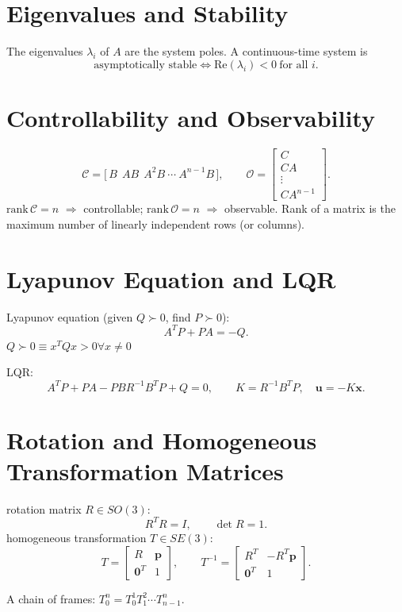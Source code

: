 \documentclass[10pt]{article}
\begin{document}
\section{Eigenvalues and Stability}
The eigenvalues $\lambda_i$ of $A$ are the system poles. A continuous-time system is
\[
\text{asymptotically stable} \iff \mathrm{Re}(\lambda_i)<0\ \text{for all } i.
\]

\section{Controllability and Observability}
\[
\mathcal{C}=\big[\,B\ \ AB\ \ A^2B\ \cdots\ A^{n-1}B\,\big],\qquad
\mathcal{O}=\begin{bmatrix} C\\ CA\\ \vdots\\ CA^{n-1}\end{bmatrix}.
\]
$\mathrm{rank}\,\mathcal{C}=n$ $\Rightarrow$ controllable; $\mathrm{rank}\,\mathcal{O}=n$ $\Rightarrow$ observable.
Rank of a matrix is the maximum number of linearly independent rows (or columns).

\section{Lyapunov Equation and LQR}
Lyapunov equation (given $Q\succ0$, find $P\succ0$):
\[
    A^{T}P+PA=-Q.
\]
$Q\succ0 \equiv x^{T}Qx > 0      \forall x \neq 0$

LQR:
\[
A^TP+PA-PBR^{-1}B^TP+Q=0,\qquad K=R^{-1}B^TP,\quad \mathbf{u}=-K\mathbf{x}.
\]

\section{Rotation and Homogeneous Transformation Matrices}
rotation matrix $R\in SO(3)$:
\[
R^TR=I,\qquad \det R=1.
\]
homogeneous transformation $T\in SE(3)$:
\[
T=\begin{bmatrix} R & \mathbf{p}\\ \mathbf{0}^T & 1\end{bmatrix},\qquad
T^{-1}=\begin{bmatrix} R^T & -R^T\mathbf{p}\\ \mathbf{0}^T & 1\end{bmatrix}.
\]

A chain of frames: $T_0^n=T_0^1 T_1^2\cdots T_{n-1}^n$.
\end{document}
